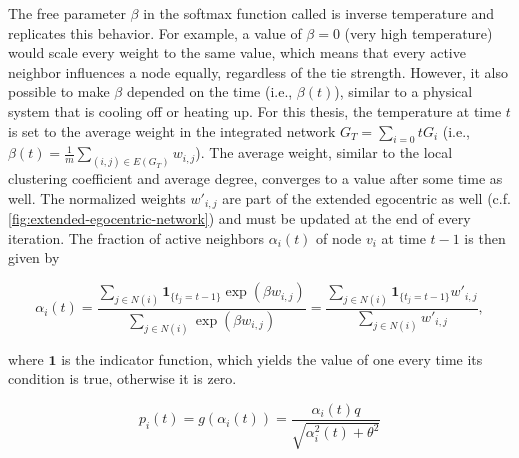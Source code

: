 The free parameter \( \beta \) in the softmax function called is inverse temperature and replicates this behavior.
For example, a value of \( \beta = 0 \) (very high temperature) would scale every weight to the same value, which means that every active neighbor influences a node equally, regardless of the tie strength.
However, it also possible to make \( \beta \) depended on the time (i.e., \( \beta(t) \)), similar to a physical system that is cooling off or heating up.
For this thesis, the temperature at time \( t \) is set to the average weight in the integrated network \( G_{T} = \sum_{i=0}{t} G_{i}\) (i.e., \( \beta(t) = \frac{1}{m} \sum_{(i,j) \in E(G_{T})} w_{i,j} \)).
The average weight, similar to the local clustering coefficient and average degree, converges to a value after some time as well.
The normalized weights \( w'_{i,j} \) are part of the extended egocentric as well (c.f. \autoref{fig:extended-egocentric-network}) and must be updated at the end of every iteration.
The fraction of active neighbors \( \alpha_{i}(t) \) of node \(v_{i} \) at time \( t - 1 \) is then given by

\begin{equation}
    \alpha_{i}(t) = \frac{\sum_{j \in N(i)} \mathbf{1}_{\{t_{j} = t-1\}} \exp(\beta w_{i, j})}{\sum_{j \in N(i)} \exp(\beta w_{i, j})} = \frac{\sum_{j \in N(i)} \mathbf{1}_{\{t_{j} = t-1\}} w'_{i, j}}{\sum_{j \in N(i)} w'_{i, j}},
\end{equation}

where \( \mathbf{1} \) is the indicator function, which yields the value of one every time its condition is true, otherwise it is zero.

\begin{equation}
    p_{i}(t) = g(\alpha_{i}(t)) = \frac{\alpha_{i}(t) q}{\sqrt{\alpha_{i}^{2}(t) + \theta^2}}
\end{equation}



